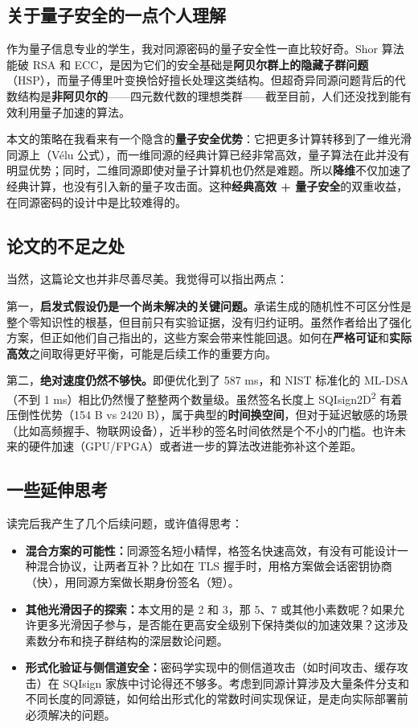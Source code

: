 \documentclass[12pt,a4paper]{ctexart}
\begin{document}
\subsection{关于\textbf{量子安全}的一点个人理解}

作为量子信息专业的学生，我对同源密码的量子安全性一直比较好奇。Shor 算法能破 RSA 和 ECC，是因为它们的安全基础是\textbf{阿贝尔群上的隐藏子群问题}（HSP），而量子傅里叶变换恰好擅长处理这类结构。但超奇异同源问题背后的代数结构是\textbf{非阿贝尔的}——四元数代数的理想类群——截至目前，人们还没找到能有效利用量子加速的算法。

本文的策略在我看来有一个隐含的\textbf{量子安全优势}：它把更多计算转移到了一维光滑同源上（V\'{e}lu 公式），而一维同源的经典计算已经非常高效，量子算法在此并没有明显优势；同时，二维同源即使对量子计算机也仍然是难题。所以\textbf{降维}不仅加速了经典计算，也没有引入新的量子攻击面。这种\textbf{经典高效 + 量子安全}的双重收益，在同源密码的设计中是比较难得的。

\subsection{论文的不足之处}

当然，这篇论文也并非尽善尽美。我觉得可以指出两点：

第一，\textbf{启发式假设仍是一个尚未解决的关键问题。}承诺生成的随机性不可区分性是整个零知识性的根基，但目前只有实验证据，没有归约证明。虽然作者给出了强化方案，但正如他们自己指出的，这些方案会带来性能回退。如何在\textbf{严格可证}和\textbf{实际高效}之间取得更好平衡，可能是后续工作的重要方向。

第二，\textbf{绝对速度仍然不够快。}即便优化到了 587 ms，和 NIST 标准化的 ML-DSA（不到 1 ms）相比仍然慢了整整两个数量级。虽然签名长度上 SQIsign2D\textsuperscript{2} 有着压倒性优势（154 B vs 2420 B），属于典型的\textbf{时间换空间}，但对于延迟敏感的场景（比如高频握手、物联网设备），近半秒的签名时间依然是个不小的门槛。也许未来的硬件加速（GPU/FPGA）或者进一步的算法改进能弥补这个差距。

\subsection{一些延伸思考}

读完后我产生了几个后续问题，或许值得思考：

\begin{thinkbox}
\begin{itemize}
    \item \textbf{混合方案的可能性：}同源签名短小精悍，格签名快速高效，有没有可能设计一种混合协议，让两者互补？比如在 TLS 握手时，用格方案做会话密钥协商（快），用同源方案做长期身份签名（短）。
    \item \textbf{其他光滑因子的探索：}本文用的是 2 和 3，那 5、7 或其他小素数呢？如果允许更多光滑因子参与，是否能在更高安全级别下保持类似的加速效果？这涉及素数分布和挠子群结构的深层数论问题。
    \item \textbf{形式化验证与侧信道安全：}密码学实现中的侧信道攻击（如时间攻击、缓存攻击）在 SQIsign 家族中讨论得还不够多。考虑到同源计算涉及大量条件分支和不同长度的同源链，如何给出形式化的常数时间实现保证，是走向实际部署前必须解决的问题。
\end{itemize}
\end{thinkbox}
\end{document}
